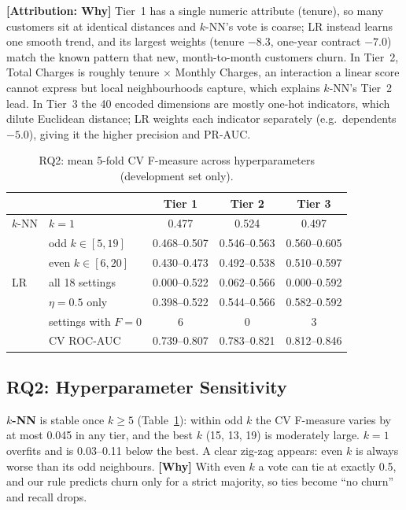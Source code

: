 \documentclass[sigconf,nonacm]{acmart}
\begin{document}
\textbf{[Attribution: Why]} Tier~1 has a single numeric attribute (tenure), so many customers sit at identical distances and $k$-NN's vote is coarse; LR instead learns one smooth trend, and its largest weights (tenure $-8.3$, one-year contract $-7.0$) match the known pattern that new, month-to-month customers churn. In Tier~2, Total Charges is roughly tenure $\times$ Monthly Charges, an interaction a linear score cannot express but local neighbourhoods capture, which explains $k$-NN's Tier~2 lead. In Tier~3 the 40 encoded dimensions are mostly one-hot indicators, which dilute Euclidean distance; LR weights each indicator separately (e.g.\ dependents $-5.0$), giving it the higher precision and PR-AUC.

\begin{table}[t]
\caption{RQ2: mean 5-fold CV F-measure across hyperparameters (development set only).}\label{tab:rq2}
\small\setlength{\tabcolsep}{1.8pt}
\begin{tabular}{@{}llccc@{}}
\toprule
 & & Tier 1 & Tier 2 & Tier 3\\
\midrule
$k$-NN & $k=1$ & 0.477 & 0.524 & 0.497\\
 & odd $k\in[5,19]$ & 0.468--0.507 & 0.546--0.563 & 0.560--0.605\\
 & even $k\in[6,20]$ & 0.430--0.473 & 0.492--0.538 & 0.510--0.597\\
\midrule
LR & all 18 settings & 0.000--0.522 & 0.062--0.566 & 0.000--0.592\\
 & $\eta=0.5$ only & 0.398--0.522 & 0.544--0.566 & 0.582--0.592\\
 & settings with $F{=}0$ & 6 & 0 & 3\\
 & CV ROC-AUC & 0.739--0.807 & 0.783--0.821 & 0.812--0.846\\
\bottomrule
\end{tabular}
\end{table}

\subsection{RQ2: Hyperparameter Sensitivity}
\textbf{$k$-NN} is stable once $k\ge5$ (Table~\ref{tab:rq2}): within odd $k$ the CV F-measure varies by at most 0.045 in any tier, and the best $k$ (15, 13, 19) is moderately large. $k=1$ overfits and is 0.03--0.11 below the best. A clear zig-zag appears: even $k$ is always worse than its odd neighbours. \textbf{[Why]} With even $k$ a vote can tie at exactly 0.5, and our rule predicts churn only for a strict majority, so ties become ``no churn'' and recall drops.
\end{document}
